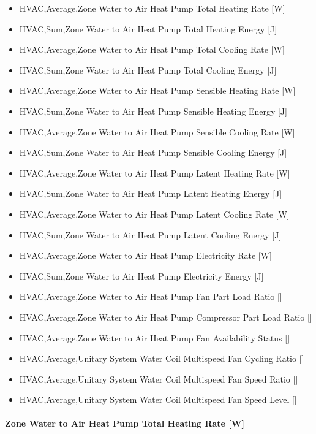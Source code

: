 \begin{itemize}
\item
  HVAC,Average,Zone Water to Air Heat Pump Total Heating Rate {[}W{]}
\item
  HVAC,Sum,Zone Water to Air Heat Pump Total Heating Energy {[}J{]}
\item
  HVAC,Average,Zone Water to Air Heat Pump Total Cooling Rate {[}W{]}
\item
  HVAC,Sum,Zone Water to Air Heat Pump Total Cooling Energy {[}J{]}
\item
  HVAC,Average,Zone Water to Air Heat Pump Sensible Heating Rate {[}W{]}
\item
  HVAC,Sum,Zone Water to Air Heat Pump Sensible Heating Energy {[}J{]}
\item
  HVAC,Average,Zone Water to Air Heat Pump Sensible Cooling Rate {[}W{]}
\item
  HVAC,Sum,Zone Water to Air Heat Pump Sensible Cooling Energy {[}J{]}
\item
  HVAC,Average,Zone Water to Air Heat Pump Latent Heating Rate {[}W{]}
\item
  HVAC,Sum,Zone Water to Air Heat Pump Latent Heating Energy {[}J{]}
\item
  HVAC,Average,Zone Water to Air Heat Pump Latent Cooling Rate {[}W{]}
\item
  HVAC,Sum,Zone Water to Air Heat Pump Latent Cooling Energy {[}J{]}
\item
  HVAC,Average,Zone Water to Air Heat Pump Electricity Rate {[}W{]}
\item
  HVAC,Sum,Zone Water to Air Heat Pump Electricity Energy {[}J{]}
\item
  HVAC,Average,Zone Water to Air Heat Pump Fan Part Load Ratio {[]}
\item
  HVAC,Average,Zone Water to Air Heat Pump Compressor Part Load Ratio {[]}
\item
  HVAC,Average,Zone Water to Air Heat Pump Fan Availability Status {[]}
\item
  HVAC,Average,Unitary System Water Coil Multispeed Fan Cycling Ratio {[]}
\item
  HVAC,Average,Unitary System Water Coil Multispeed Fan Speed Ratio {[]}
\item
  HVAC,Average,Unitary System Water Coil Multispeed Fan Speed Level {[]}
\end{itemize}

\paragraph{Zone Water to Air Heat Pump Total Heating Rate {[}W{]}}\label{zone-water-to-air-heat-pump-total-heating-rate-w}

